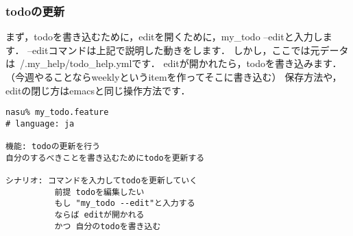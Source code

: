 \subsubsection{todoの更新}
まず，todoを書き込むために，editを開くために，my\_todo --editと入力します．
--editコマンドは上記で説明した動きをします．
しかし，ここでは元データは~/.my\_help/todo\_help.ymlです．
editが開かれたら，todoを書き込みます．（今週やることならweeklyというitemを作ってそこに書き込む）
保存方法や，editの閉じ方はemacsと同じ操作方法です．
\begin{lstlisting}[style=customRuby]
nasu% my_todo.feature
# language: ja

機能: todoの更新を行う
自分のするべきことを書き込むためにtodoを更新する

シナリオ: コマンドを入力してtodoを更新していく
          前提 todoを編集したい
          もし "my_todo --edit"と入力する
          ならば editが開かれる
          かつ 自分のtodoを書き込む

\end{lstlisting}
